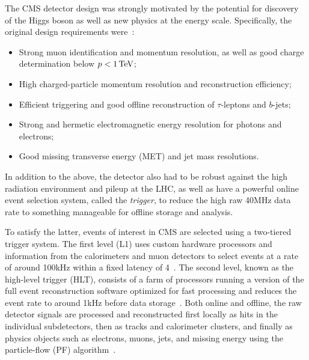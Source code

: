 
The CMS detector design was strongly motivated by the potential for discovery of the Higgs boson as well as new physics at the \TeV energy scale.
Specifically, the original design requirements were~\cite{CMS:2008xjf}:
\begin{itemize}
    \item Strong muon identification and momentum resolution, as well as good charge determination below $p < 1\,\text{Te\hspace{-.08em}V}$;
    \item High charged-particle momentum resolution and reconstruction efficiency;
    \item Efficient triggering and good offline reconstruction of $\tau$-leptons and $b$-jets;
    \item Strong and hermetic electromagnetic energy resolution for photons and electrons;
    \item Good missing transverse energy (MET) and jet mass resolutions.
\end{itemize}
In addition to the above, the detector also had to be robust against the high radiation environment and pileup at the LHC, as well as have a powerful online event selection system, called the \textit{trigger}, to reduce the high raw 40\unit{MHz} data rate to something manageable for offline storage and analysis.

To satisfy the latter, events of interest in CMS are selected using a two-tiered trigger system.
The first level (L1) uses custom hardware processors and information from the calorimeters and muon detectors to select events at a rate of around 100\unit{kHz} within a fixed latency of 4\unit{\mus}~\cite{CMS:2020cmk}.
The second level, known as the high-level trigger (HLT), consists of a farm of processors running a version of the full event reconstruction software optimized for fast processing and reduces the event rate to around 1\unit{kHz} before data storage~\cite{CMS:2016ngn}.
Both online and offline, the raw detector signals are processed and reconstructed first locally as hits in the individual subdetectors, then as tracks and calorimeter clusters, and finally as physics objects such as electrons, muons, jets, and missing energy using the particle-flow (PF) algorithm~\cite{CMS:2017yfk}.

